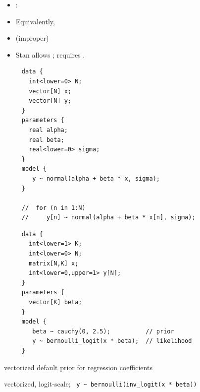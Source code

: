 \documentclass[10pt]{report}
\begin{document}
\begin{itemize}
\item {}:
\item Equivalently,
\item {} (improper)
\item Stan allows ; requires .
\end{itemize}


{\footnotesize
\begin{Verbatim}
     data {
       int<lower=0> N;
       vector[N] x;
       vector[N] y;
     }
     parameters {
       real alpha;   
       real beta;
       real<lower=0> sigma;
     }
     model {
        y ~ normal(alpha + beta * x, sigma);
     }

     //  for (n in 1:N)
     //     y[n] ~ normal(alpha + beta * x[n], sigma);
\end{Verbatim}

}


\vspace*{2pt}
{\footnotesize
\begin{Verbatim}
     data {
       int<lower=1> K;
       int<lower=0> N;
       matrix[N,K] x;
       int<lower=0,upper=1> y[N];
     }
     parameters {
       vector[K] beta;
     }
     model {
        beta ~ cauchy(0, 2.5);          // prior
        y ~ bernoulli_logit(x * beta);  // likelihood
     }
\end{Verbatim}
}
\vspace*{-2pt}
\begin{subitemize}
\item vectorized default prior for regression coefficients 
\item vectorized, logit-scale; \ {\footnotesize \Verb|y ~ bernoulli(inv_logit(x * beta))|}
\end{subitemize}
\end{document}
